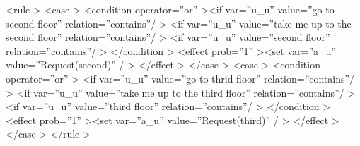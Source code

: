 \documentclass[a4paper, 12pt]{article}
\begin{document}
  \textless rule \textgreater \newline
  \indent \indent \textless  case \textgreater \newline
  \indent \indent \indent \textless condition operator=”or”  \textgreater \newline\indent \indent \indent \indent \textless if var=”u\_u” value=”go to second floor” relation=”contains”/  \textgreater \newline
  \indent \indent \indent \indent \textless if var=”u\_u” value=”take me up to the second floor” \newline
  \indent \indent \indent \indent relation=”contains”/ \textgreater \newline
  \indent  \indent \indent \indent \textless if var=”u\_u” value=”second floor” relation=”contains”/ \textgreater \newline
  \indent \indent \indent \textless /condition \textgreater \newline
  \indent \indent \indent \textless effect prob=”1” \textgreater \textless set var=”a\_u” value=”Request(second)” / \textgreater \newline
  \indent \indent \indent \textless /effect \textgreater \newline
  \indent \indent \textless /case \textgreater \newline
  \indent \indent \textless case \textgreater \newline
  \indent \indent \indent \textless condition operator=”or” \textgreater \newline
  \indent \indent \indent \indent \textless if var=”u\_u” value=”go to thrid floor” relation=”contains”/ \textgreater \newline
  \indent \indent \indent \indent \textless if var=”u\_u” value=”take me up to the third floor” relation=”contains”/ \textgreater \newline
  \indent \indent \indent \indent \textless if var=”u\_u” value=”third floor” relation=”contains”/ \textgreater \newline
   \indent \indent \indent \textless /condition \textgreater \newline
   \indent \indent  \textless effect prob=”1” \textgreater \textless set var=”a\_u” value=”Request(third)” / \textgreater \newline
   \indent \indent  \textless /effect \textgreater \newline
   \indent \indent \textless /case \textgreater \newline
   \indent \textless /rule \textgreater \newline
\end{document}
